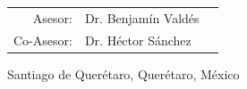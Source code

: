 \documentclass[11pt, a4paper, oneside]{Thesis} %
\begin{document}
\begin{titlepage}
\begin{center}
\begin{table}[!h]
\begin{center}
\begin{tabular}{lll}
\multicolumn{1}{r}{Asesor:} & Dr. Benjamín Valdés \\  %
\multicolumn{1}{r}{Co-Asesor:} & Dr. Héctor Sánchez \\
\end{tabular}
\end{center}
\end{table}

\vspace{3cm}
Santiago de Querétaro, Querétaro, México \\

{\large {}}\\[1.5cm]
\vfill
\end{center}

\end{titlepage}


\clearpage %











\end{document}
